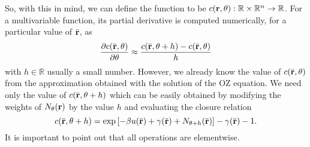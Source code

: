 So, with this in mind, we can define the function to be 
$c(\mathbf{r}, \theta) : \mathbb{R} \times \mathbb{R}^{n} \to \mathbb{R}$.
For a multivariable function, its partial derivative is computed numerically,
for a particular value of $\bar{\mathbf{r}}$, as
\begin{equation}
    \frac{\partial c(\bar{\mathbf{r}}, \theta)}{\partial \theta} \approx
    \frac{c(\bar{\mathbf{r}}, \theta + h) - c(\bar{\mathbf{r}}, \theta)}{h}
    \label{eq:num-diff}
\end{equation}
with $h \in \mathbb{R}$ usually a small number. However, we already know the value
of $c(\bar{\mathbf{r}}, \theta)$ from the approximation obtained with the solution of
the OZ equation. We need only the value of $c(\bar{\mathbf{r}}, \theta + h)$ which can
be easily obtained by modifying the weights of $N_{\theta}(\mathbf{r})$ by the value $h$ and evaluating
the closure relation
\[
    c(\bar{\mathbf{r}}, \theta + h) = \exp{\left[-\beta u(\bar{\mathbf{r}}) + \gamma(\bar{\mathbf{r}}) + N_{\theta + h}(\bar{\mathbf{r}})\right] - \gamma(\bar{\mathbf{r}}) - 1} .
\]
It is important to point out that all operations are elementwise.

